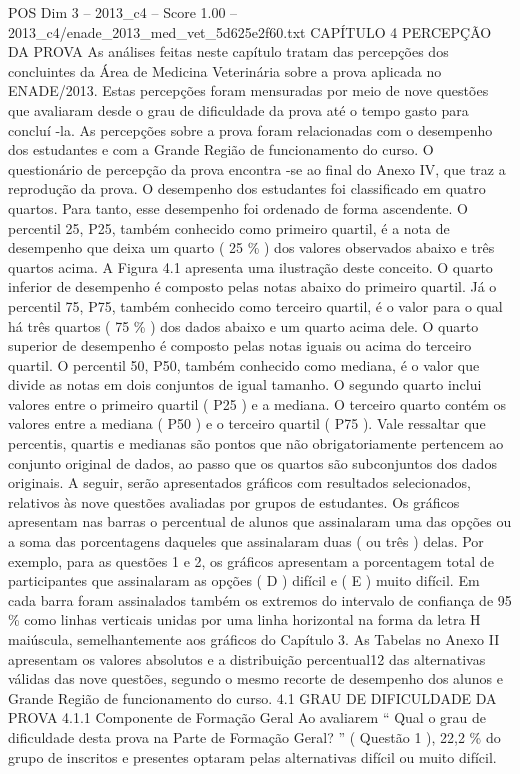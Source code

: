 \begin{textsample}{POS Dim 3 – 2013\_c4 – Score 1.00 – 2013\_c4/enade\_2013\_med\_vet\_5d625e2f60.txt}  \label{ex:f3_pos_169}
CAPÍTULO 4 PERCEPÇÃO DA PROVA As análises feitas neste capítulo tratam das percepções dos concluintes da Área de Medicina Veterinária sobre a prova aplicada no ENADE/2013.
Estas percepções foram mensuradas por meio de nove questões que avaliaram desde o grau de dificuldade da prova até o tempo gasto para concluí -la.
As percepções sobre a prova foram relacionadas com o desempenho dos estudantes e com a Grande Região de funcionamento do curso.
O questionário de percepção da prova encontra -se ao final do Anexo IV, que traz a reprodução da prova.
O desempenho dos estudantes foi classificado em quatro quartos.
Para tanto, esse desempenho foi ordenado de forma ascendente.
O percentil 25, P25, também conhecido como primeiro quartil, é a nota de desempenho que deixa um quarto ( 25 \% ) dos valores observados abaixo e três quartos acima.
A Figura 4.1 apresenta uma ilustração deste conceito.
O quarto inferior de desempenho é composto pelas notas abaixo do primeiro quartil.
Já o percentil 75, P75, também conhecido como terceiro quartil, é o valor para o qual há três quartos ( 75 \% ) dos dados abaixo e um quarto acima dele.
O quarto superior de desempenho é composto pelas notas iguais ou acima do terceiro quartil.
O percentil 50, P50, também conhecido como mediana, é o valor que divide as notas em dois conjuntos de igual tamanho.
O segundo quarto inclui valores entre o primeiro quartil ( P25 ) e a mediana.
O terceiro quarto contém os valores entre a mediana ( P50 ) e o terceiro quartil ( P75 ).
Vale ressaltar que percentis, quartis e medianas são pontos que não obrigatoriamente pertencem ao conjunto original de dados, ao passo que os quartos são subconjuntos dos dados originais.
A seguir, serão apresentados gráficos com resultados selecionados, relativos às nove questões avaliadas por grupos de estudantes.
Os gráficos apresentam nas barras o percentual de alunos que assinalaram uma das opções ou a soma das porcentagens daqueles que assinalaram duas ( ou três ) delas.
Por exemplo, para as questões 1 e 2, os gráficos apresentam a porcentagem total de participantes que assinalaram as opções ( D ) difícil e ( E ) muito difícil.
Em cada barra foram assinalados também os extremos do intervalo de confiança de 95 \% como linhas verticais unidas por uma linha horizontal na forma da letra H maiúscula, semelhantemente aos gráficos do Capítulo 3.
As Tabelas no Anexo II apresentam os valores absolutos e a distribuição percentual12 das alternativas válidas das nove questões, segundo o mesmo recorte de desempenho dos alunos e Grande Região de funcionamento do curso. 4.1 GRAU DE DIFICULDADE DA PROVA 4.1.1 Componente de Formação Geral Ao avaliarem “ Qual o grau de dificuldade desta prova na Parte de Formação Geral? ” ( Questão 1 ), 22,2 \% do grupo de inscritos e presentes optaram pelas alternativas difícil ou muito difícil.

\end{textsample}
